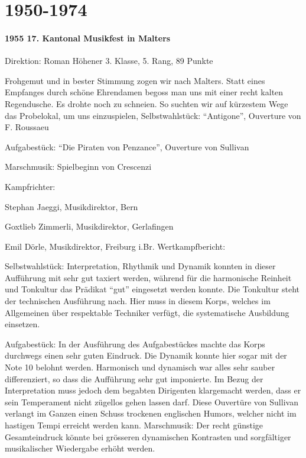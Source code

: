 \chapter{1950-1974}

\begin{history}

    \subsubsection*{1955 17. Kantonal Musikfest in Malters}

    Direktion: Roman Höhener 3. Klasse, 5. Rang, 89 Punkte

    Frohgemut und in bester Stimmung zogen wir nach Malters. Statt eines
    Empfanges durch schöne Ehrendamen begoss man uns mit einer recht kalten
    Regendusche. Es drohte noch zu schneien. So suchten wir auf kürzestem Wege
    das Probelokal, um uns einzuspielen, Selbstwahlstück: \enquote{Antigone},
    Ouverture von F. Roussaeu

    Aufgabestück: \enquote{Die Piraten von Penzance}, Ouverture von Sullivan

    Marschmusik: Spielbeginn von Crescenzi

    Kampfrichter:

    Stephan Jaeggi, Musikdirektor, Bern

    Goxtlieb Zimmerli, Musikdirektor, Gerlafingen

    Emil Dörle, Musikdirektor, Freiburg i.Br. Wertkampfbericht:

    Selbstwahlstück: Interpretation, Rhythmik und Dynamik konnten in dieser
    Aufführung mit sehr gut taxiert werden, während für die harmonische Reinheit
    und Tonkultur das Prädikat \enquote{gut} eingesetzt werden konnte. Die
    Tonkultur steht der technischen Ausführung nach. Hier muss in diesem Korps,
    welches im Allgemeinen über respektable Techniker verfügt, die systematische
    Ausbildung einsetzen.

    Aufgabestück: In der Ausführung des Aufgabestückes machte das Korps
    durchwegs einen sehr guten Eindruck. Die Dynamik konnte hier sogar mit der
    Note 10 belohnt werden. Harmonisch und dynamisch war alles sehr sauber
    differenziert, so dass die Aufführung sehr gut imponierte. Im Bezug der
    Interpretation muss jedoch dem begabten Dirigenten klargemacht werden, dass
    er sein Temperament nicht zügellos gehen lassen darf. Diese Ouvertüre von
    Sullivan verlangt im Ganzen einen Schuss trockenen englischen Humors,
    welcher nicht im hastigen Tempi erreicht werden kann. Marschmusik: Der recht
    günstige Gesamteindruck könnte bei grösseren dynamischen Kontrasten und
    sorgfältiger musikalischer Wiedergabe erhöht werden.



\end{history}

